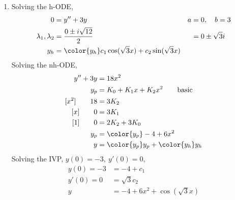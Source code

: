 \begin{enumerate}
    \item Solving the h-ODE,
          \begin{align}
              0                        & = y'' + 3y                                                & a & = 0, \quad b = 3  \\
              \lambda_{1}, \lambda_{2} & = \frac{0 \pm i\sqrt{12}}{2}                              &   & = 0 \pm \sqrt{3}i \\
              y_{h}                    & = \color{y_h} c_{1}\cos(\sqrt{3}x) + c_{2}\sin(\sqrt{3}x)
          \end{align}
          Solving the nh-ODE,
          \begin{align}
              y'' + 3y          & = 18x^{2}                                         \\
              y_{p}             & = K_{0} + K_{1}x + K_{2}x^{2} \qquad \text{basic} \\
              [x^{2}] \qquad 18 & = 3K_{2}                                          \\
              [x] \qquad 0      & = 3K_{1}                                          \\
              [1] \qquad 0      & = 2K_{2} + 3K_{0}                                 \\
              y_{p}             & = \color{y_p} -4 + 6x^{2}                         \\
              y                 & = {\color{y_p} y_{p}} + {\color{y_h} y_{h}}
          \end{align}
          Solving the IVP, $ y(0) = -3,\ y'(0) = 0 $,
          \begin{align}
              y(0) = -3 & = -4 + c_{1}                    \\
              y'(0) = 0 & =\sqrt{3}c_{2}                  \\
              y         & = -4 + 6x^{2} + \cos(\sqrt{3}x)
          \end{align}


\end{enumerate}
